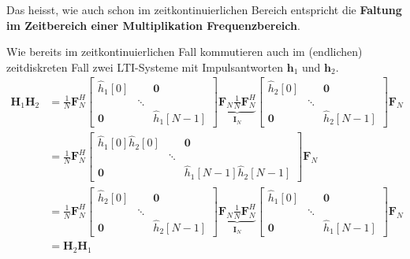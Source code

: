 \documentclass[11pt]{article}
\begin{document}
\vspace*{-0.5cm}
Das heisst, wie auch schon im zeitkontinuierlichen Bereich entspricht die \textbf{Faltung im Zeitbereich einer Multiplikation Frequenzbereich}.

Wie bereits im zeitkontinuierlichen Fall kommutieren auch im (endlichen) zeitdiskreten Fall zwei LTI-Systeme mit Impulsantworten $\mathbf{h}_1$ und $\mathbf{h}_2$.
\vspace*{-0.25cm}
\begin{align*}
    \mathbf{H}_1 \mathbf{H}_2 &= \frac{1}{N} \mathbf{F}_N^H \begin{bmatrix}
        \hat{h}_1[0] & & \mathbf{0} \\
        & \ddots & \\
        \mathbf{0} & & \hat{h}_1[N-1]
    \end{bmatrix} \underbrace{\mathbf{F}_N \frac{1}{N} \mathbf{F}_N^H}_{\mathbf{I}_N}  \begin{bmatrix}
        \hat{h}_2[0] & & \mathbf{0} \\
        & \ddots & \\
        \mathbf{0} & & \hat{h}_2[N-1]
    \end{bmatrix}\mathbf{F}_N \\
    &= \frac{1}{N} \mathbf{F}_N^H \begin{bmatrix}
        \hat{h}_1[0]\hat{h}_2[0] & & \mathbf{0} \\
        & \ddots & \\
        \mathbf{0} & & \hat{h}_1[N-1]\hat{h}_2[N-1]
    \end{bmatrix}\mathbf{F}_N \\
    &= \frac{1}{N} \mathbf{F}_N^H \begin{bmatrix}
        \hat{h}_2[0] & & \mathbf{0} \\
        & \ddots & \\
        \mathbf{0} & & \hat{h}_2[N-1]
    \end{bmatrix} \underbrace{\mathbf{F}_N \frac{1}{N} \mathbf{F}_N^H}_{\mathbf{I}_N}  \begin{bmatrix}
        \hat{h}_1[0] & & \mathbf{0} \\
        & \ddots & \\
        \mathbf{0} & & \hat{h}_1[N-1]
    \end{bmatrix} \mathbf{F}_N \\
    &= \mathbf{H}_2 \mathbf{H}_1
\end{align*}
\end{document}
